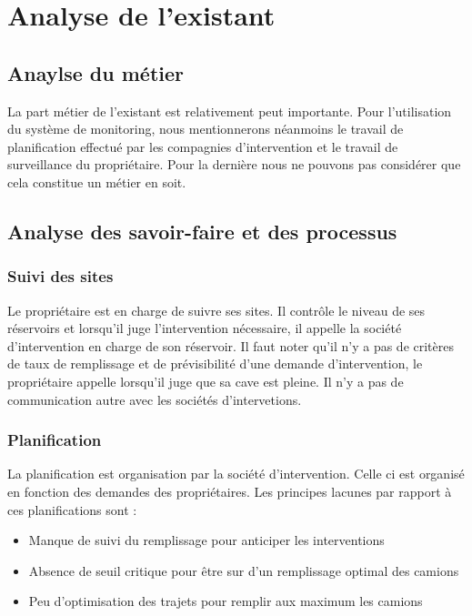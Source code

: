 \section{Analyse de l'existant}

\subsection{Anaylse du métier}

La part métier de l'existant est relativement peut importante. Pour l'utilisation du système de monitoring, nous mentionnerons néanmoins le travail de planification effectué par les compagnies d'intervention et le travail de surveillance du propriétaire. Pour la dernière nous ne pouvons pas considérer que cela constitue un métier en soit.

\subsection{Analyse des savoir-faire et des processus}

\subsubsection{Suivi des sites}

Le propriétaire est en charge de suivre ses sites. Il contrôle le niveau de ses réservoirs et lorsqu'il juge l'intervention nécessaire, il appelle la société d'intervention en charge de son réservoir. Il faut noter qu'il n'y a pas de critères de taux de remplissage et de prévisibilité d'une demande d'intervention, le propriétaire appelle lorsqu'il juge que sa cave est pleine.
Il n'y a pas de communication autre avec les sociétés d'intervetions.


\subsubsection{Planification}

La planification est organisation par la société d'intervention. Celle ci est organisé en fonction des demandes des propriétaires. Les principes lacunes par rapport à ces planifications sont : 
\begin{itemize}
\item Manque de suivi du remplissage pour anticiper les interventions
\item Absence de seuil critique pour être sur d'un remplissage optimal des camions
\item Peu d'optimisation des trajets pour remplir aux maximum les camions
\end{itemize}

